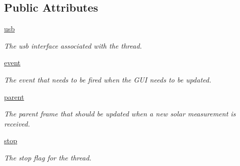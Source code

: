 \subsection*{Public Attributes}
\begin{DoxyCompactItemize}
\item 
\hypertarget{classtiny26_1_1_solar_tracking_thread_a4b7452fd152929e399adf0e263c6e472}{\hyperlink{classtiny26_1_1_solar_tracking_thread_a4b7452fd152929e399adf0e263c6e472}{usb}}\label{classtiny26_1_1_solar_tracking_thread_a4b7452fd152929e399adf0e263c6e472}

\begin{DoxyCompactList}\small\item\em The usb interface associated with the thread. \end{DoxyCompactList}\item 
\hypertarget{classtiny26_1_1_solar_tracking_thread_a806015811adc26b8af26f48ce2c1de78}{\hyperlink{classtiny26_1_1_solar_tracking_thread_a806015811adc26b8af26f48ce2c1de78}{event}}\label{classtiny26_1_1_solar_tracking_thread_a806015811adc26b8af26f48ce2c1de78}

\begin{DoxyCompactList}\small\item\em The event that needs to be fired when the G\-U\-I needs to be updated. \end{DoxyCompactList}\item 
\hypertarget{classtiny26_1_1_solar_tracking_thread_a96bd262571f5cefa8f5fcb05256745cb}{\hyperlink{classtiny26_1_1_solar_tracking_thread_a96bd262571f5cefa8f5fcb05256745cb}{parent}}\label{classtiny26_1_1_solar_tracking_thread_a96bd262571f5cefa8f5fcb05256745cb}

\begin{DoxyCompactList}\small\item\em The parent frame that should be updated when a new solar measurement is received. \end{DoxyCompactList}\item 
\hypertarget{classtiny26_1_1_solar_tracking_thread_a03b6d1de5dd4ebf8d64450d248ad0fe9}{\hyperlink{classtiny26_1_1_solar_tracking_thread_a03b6d1de5dd4ebf8d64450d248ad0fe9}{stop}}\label{classtiny26_1_1_solar_tracking_thread_a03b6d1de5dd4ebf8d64450d248ad0fe9}

\begin{DoxyCompactList}\small\item\em The stop flag for the thread. \end{DoxyCompactList}\end{DoxyCompactItemize}


